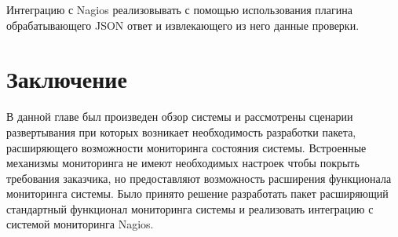 Интеграцию с Nagios реализовывать с помощью использования плагина обрабатывающего JSON ответ и извлекающего из него данные проверки.

\section{Заключение}
В данной главе был произведен обзор системы и рассмотрены сценарии развертывания при которых возникает необходимость разработки пакета, расширяющего возможности мониторинга состояния системы. Встроенные механизмы мониторинга не имеют необходимых настроек чтобы покрыть требования заказчика, но предоставляют возможность расширения функционала мониторинга системы. Было принято решение разработать пакет расширяющий стандартный функционал мониторинга системы и реализовать интеграцию с системой мониторинга Nagios.


